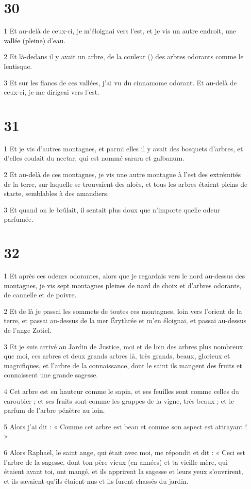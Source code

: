 \chapter{30}

\par 1 Et au-delà de ceux-ci, je m'éloignai vers l'est, et je vis un autre endroit, une vallée (pleine) d'eau.
\par 2 Et là-dedans il y avait un arbre, de la couleur () des arbres odorants comme le lentisque.
\par 3 Et sur les flancs de ces vallées, j'ai vu du cinnamome odorant. Et au-delà de ceux-ci, je me dirigeai vers l'est.

\chapter{31}

\par 1 Et je vis d'autres montagnes, et parmi elles il y avait des bosquets d'arbres, et d'elles coulait du nectar, qui est nommé sarara et galbanum.
\par 2 Et au-delà de ces montagnes, je vis une autre montagne à l'est des extrémités de la terre, sur laquelle se trouvaient des aloès, et tous les arbres étaient pleins de stacte, semblables à des amandiers.
\par 3 Et quand on le brûlait, il sentait plus doux que n'importe quelle odeur parfumée.

\chapter{32}

\par 1 Et après ces odeurs odorantes, alors que je regardais vers le nord au-dessus des montagnes, je vis sept montagnes pleines de nard de choix et d'arbres odorants, de cannelle et de poivre.
\par 2 Et de là je passai les sommets de toutes ces montagnes, loin vers l'orient de la terre, et passai au-dessus de la mer Érythrée et m'en éloignai, et passai au-dessus de l'ange Zotiel.
\par 3 Et je suis arrivé au Jardin de Justice, moi et de loin des arbres plus nombreux que moi, ces arbres et deux grands arbres là, très grands, beaux, glorieux et magnifiques, et l'arbre de la connaissance, dont le saint ils mangent des fruits et connaissent une grande sagesse.
\par 4 Cet arbre est en hauteur comme le sapin, et ses feuilles sont comme celles du caroubier ; et ses fruits sont comme les grappes de la vigne, très beaux ; et le parfum de l'arbre pénètre au loin.
\par 5 Alors j'ai dit : « Comme cet arbre est beau et comme son aspect est attrayant ! »
\par 6 Alors Raphaël, le saint ange, qui était avec moi, me répondit et dit : « Ceci est l'arbre de la sagesse, dont ton père vieux (en années) et ta vieille mère, qui étaient avant toi, ont mangé, et ils apprirent la sagesse et leurs yeux s'ouvrirent, et ils savaient qu'ils étaient nus et ils furent chassés du jardin.

